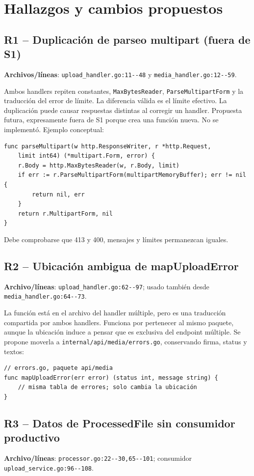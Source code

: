\documentclass[11pt,a4paper]{article}
\begin{document}
\section{Hallazgos y cambios propuestos}
\subsection{R1 -- Duplicación de parseo multipart (fuera de S1)}
\textbf{Archivos/líneas}: \nolinkurl{upload_handler.go:11--48} y \nolinkurl{media_handler.go:12--59}.

Ambos handlers repiten constantes, \nolinkurl{MaxBytesReader}, \nolinkurl{ParseMultipartForm} y la traducción del error de límite. La diferencia válida es el límite efectivo. La duplicación puede causar respuestas distintas al corregir un handler.
Propuesta futura, expresamente fuera de S1 porque crea una función nueva. No se implementó. Ejemplo conceptual:
\begin{lstlisting}
func parseMultipart(w http.ResponseWriter, r *http.Request,
    limit int64) (*multipart.Form, error) {
    r.Body = http.MaxBytesReader(w, r.Body, limit)
    if err := r.ParseMultipartForm(multipartMemoryBuffer); err != nil {
        return nil, err
    }
    return r.MultipartForm, nil
}
\end{lstlisting}
Debe comprobarse que 413 y 400, mensajes y límites permanezcan iguales.

\subsection{R2 -- Ubicación ambigua de mapUploadError}
\textbf{Archivo/líneas}: \nolinkurl{upload_handler.go:62--97}; usado también desde \nolinkurl{media_handler.go:64--73}.

La función está en el archivo del handler múltiple, pero es una traducción compartida por ambos handlers. Funciona por pertenecer al mismo paquete, aunque la ubicación induce a pensar que es exclusiva del endpoint múltiple.
Se propone moverla a \nolinkurl{internal/api/media/errors.go}, conservando firma, status y textos:
\begin{lstlisting}
// errors.go, paquete api/media
func mapUploadError(err error) (status int, message string) {
    // misma tabla de errores; solo cambia la ubicación
}
\end{lstlisting}

\subsection{R3 -- Datos de ProcessedFile sin consumidor productivo}
\textbf{Archivo/líneas}: \nolinkurl{processor.go:22--30,65--101}; consumidor \nolinkurl{upload_service.go:96--108}.
\end{document}
